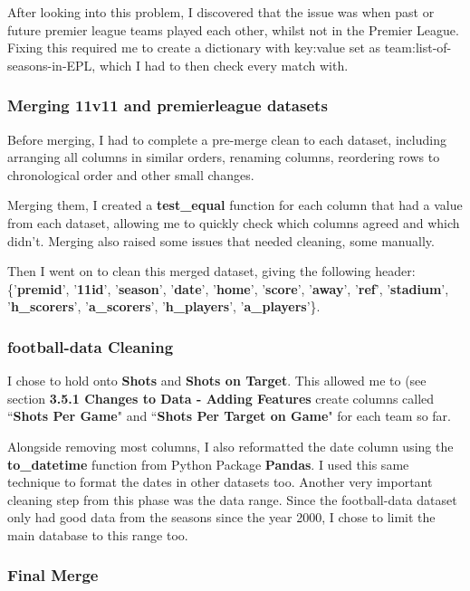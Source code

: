 \documentclass[12pt,a4paper,twoside,openright]{report}
\begin{document}
After looking into this problem, I discovered that the issue was when past or future premier league teams played each other, whilst not in the Premier League. Fixing this required me to create a dictionary with key:value set as team:list-of-seasons-in-EPL, which I had to then check every match with.

\subsubsection{Merging 11v11 and premierleague datasets}

Before merging, I had to complete a pre-merge clean to each dataset, including arranging all columns in similar orders, renaming columns, reordering rows to chronological order and other small changes.

Merging them, I created a \textbf{test\_equal} function for each column that had a value from each dataset, allowing me to quickly check which columns agreed and which didn't. Merging also raised some issues that needed cleaning, some manually.

Then I went on to clean this merged dataset, giving the following header: \{'\textbf{premid}', '\textbf{11id}', '\textbf{season}', '\textbf{date}', '\textbf{home}', '\textbf{score}', '\textbf{away}', '\textbf{ref}', '\textbf{stadium}', '\textbf{h\_scorers}', '\textbf{a\_scorers}', '\textbf{h\_players}', '\textbf{a\_players}'\}.

\subsubsection{football-data Cleaning}

I chose to hold onto \textbf{Shots} and \textbf{Shots on Target}. This allowed me to (see section \textbf{3.5.1 Changes to Data - Adding Features} create columns called ``\textbf{Shots Per Game}" and ``\textbf{Shots Per Target on Game}" for each team so far.

Alongside removing most columns, I also reformatted the date column using the \textbf{to\_datetime} function from Python Package \textbf{Pandas}. I used this same technique to format the dates in other datasets too. Another very important cleaning step from this phase was the data range. Since the football-data dataset only had good data from the seasons since the year 2000, I chose to limit the main database to this range too.

\subsubsection{Final Merge}
\end{document}
